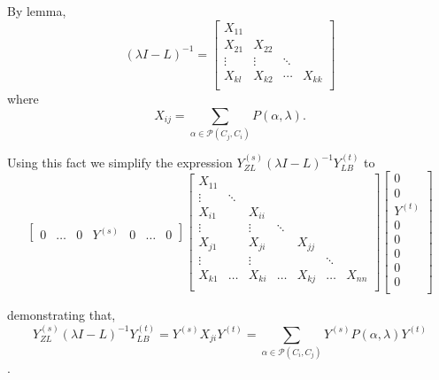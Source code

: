 \documentclass{paper}
\begin{document}
By lemma, 
\[
(\lambda I - L)^{-1}
=
\begin{bmatrix}
X_{11} \\
X_{21} & X_{22} \\
\vdots & \vdots & \ddots \\
X_{kl} & X_{k2} & \cdots & X_{kk} \\
\end{bmatrix}
\]
where
\[ X_{ij} = \sum_{\alpha \in \mathcal{P}(C_j,C_i)} P(\alpha,\lambda).
\]

Using this fact we simplify the expression $Y_{ZL}^{(s)}(\lambda I -L)^{-1}  Y_{LB}^{(t)}$ to
\[
\begin{bmatrix}
0 & \hdots &  0  & Y^{(s)} & 0 & \hdots & 0 
\end{bmatrix}
\begin{bmatrix}
X_{11}\\
\vdots & \ddots \\
X_{i1} & & X_{ii} \\
\vdots & & \vdots & \ddots \\
X_{j1} & & X_{ji} & & X_{jj} \\
\vdots & & \vdots & & & \ddots \\

X_{k1} & \hdots & X_{ki} & \hdots & X_{kj} & \hdots & X_{nn} \\
\end{bmatrix}
\begin{bmatrix}
0 \\
0 \\
Y^{(t)}\\
0 \\
0 \\
0 \\
0 \\
0 \\
\end{bmatrix}
\]

demonstrating that, 
\[
Y_{ZL}^{(s)}(\lambda I -L)^{-1}  Y_{LB}^{(t)}
=
Y^{(s)} X_{ji} Y^{(t)}
=   \sum_{\alpha \in \mathcal{P}(C_i,C_j)} Y^{(s)}P(\alpha,\lambda) Y^{(t)}
\].
\end{document}
